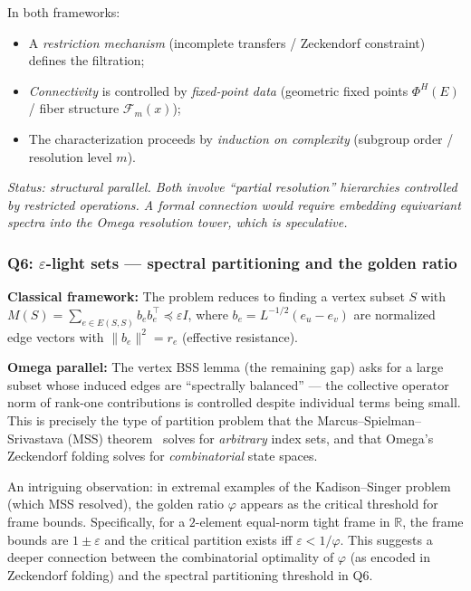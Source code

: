 In both frameworks:
\begin{itemize}[nosep]
\item A \emph{restriction mechanism} (incomplete transfers / Zeckendorf
  constraint) defines the filtration;
\item \emph{Connectivity} is controlled by \emph{fixed-point data}
  (geometric fixed points $\Phi^H(E)$ / fiber structure
  $\mathcal F_m(x)$);
\item The characterization proceeds by \emph{induction on complexity}
  (subgroup order / resolution level $m$).
\end{itemize}

\emph{Status: structural parallel.  Both involve ``partial resolution''
hierarchies controlled by restricted operations.  A formal connection
would require embedding equivariant spectra into the Omega resolution
tower, which is speculative.}


\subsubsection*{Q6: $\varepsilon$-light sets --- spectral partitioning
  and the golden ratio}

\noindent\textbf{Classical framework:} The problem reduces to finding
a vertex subset $S$ with $M(S)=\sum_{e\in E(S,S)}b_eb_e^\top\preceq
\varepsilon I$, where $b_e=L^{-1/2}(e_u-e_v)$ are normalized edge
vectors with $\|b_e\|^2=r_e$ (effective resistance).

\noindent\textbf{Omega parallel:}
The vertex BSS lemma (the remaining gap) asks for a large subset
whose induced edges are ``spectrally balanced'' --- the collective
operator norm of rank-one contributions is controlled despite
individual terms being small.
This is precisely the type of partition problem that the
Marcus--Spielman--Srivastava (MSS) theorem~\cite{mss2015} solves for
\emph{arbitrary} index sets, and that Omega's Zeckendorf folding solves
for \emph{combinatorial} state spaces.

An intriguing observation: in extremal examples of the Kadison--Singer
problem (which MSS resolved), the golden ratio $\varphi$ appears as
the critical threshold for frame bounds.  Specifically, for a
$2$-element equal-norm tight frame in $\mathbb R$, the frame bounds
are $1\pm\varepsilon$ and the critical partition exists iff
$\varepsilon<1/\varphi$.  This suggests a deeper connection between
the combinatorial optimality of $\varphi$ (as encoded in Zeckendorf
folding) and the spectral partitioning threshold in Q6.

